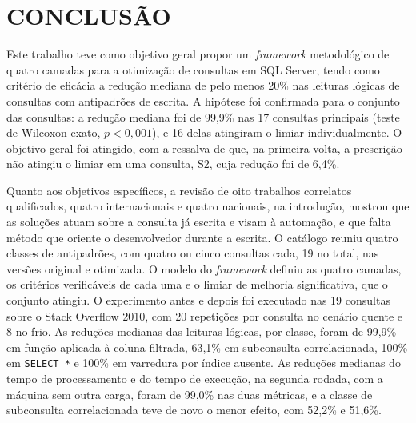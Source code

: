 
\section{CONCLUSÃO}\label{sec:conclusao}

Este trabalho teve como objetivo geral propor um \textit{framework} metodológico de quatro camadas para a otimização de consultas em SQL Server, tendo como critério de eficácia a redução mediana de pelo menos 20\% nas leituras lógicas de consultas com antipadrões de escrita. A hipótese foi confirmada para o conjunto das consultas: a redução mediana foi de 99,9\% nas 17 consultas principais (teste de Wilcoxon exato, $p < 0{,}001$), e 16 delas atingiram o limiar individualmente. O objetivo geral foi atingido, com a ressalva de que, na primeira volta, a prescrição não atingiu o limiar em uma consulta, S2, cuja redução foi de 6,4\%.

Quanto aos objetivos específicos, a revisão de oito trabalhos correlatos qualificados, quatro internacionais e quatro nacionais, na introdução, mostrou que as soluções atuam sobre a consulta já escrita e visam à automação, e que falta método que oriente o desenvolvedor durante a escrita. O catálogo reuniu quatro classes de antipadrões, com quatro ou cinco consultas cada, 19 no total, nas versões original e otimizada. O modelo do \textit{framework} definiu as quatro camadas, os critérios verificáveis de cada uma e o limiar de melhoria significativa, que o conjunto atingiu. O experimento antes e depois foi executado nas 19 consultas sobre o Stack Overflow 2010, com 20 repetições por consulta no cenário quente e 8 no frio. As reduções medianas das leituras lógicas, por classe, foram de 99,9\% em função aplicada à coluna filtrada, 63,1\% em subconsulta correlacionada, 100\% em \texttt{SELECT *} e 100\% em varredura por índice ausente. As reduções medianas do tempo de processamento e do tempo de execução, na segunda rodada, com a máquina sem outra carga, foram de 99,0\% nas duas métricas, e a classe de subconsulta correlacionada teve de novo o menor efeito, com 52,2\% e 51,6\%.

